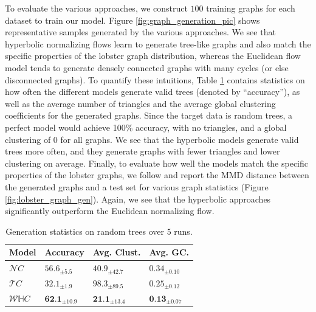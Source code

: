 To evaluate the various approaches, we construct $100$ training graphs for each dataset to train our model.
Figure \ref{fig:graph_generation_pic} shows representative samples generated by the various approaches.
We see that hyperbolic normalizing flows learn to generate tree-like graphs and also match the specific properties of the lobster graph distribution, whereas the Euclidean flow model tends to generate densely connected graphs with many cycles (or else disconnected graphs). 
To quantify these intuitions, Table \ref{tab:randtrees} contains statistics on how often the different models generate valid trees (denoted by ``accuracy''), as well as the average number of triangles and the average global clustering coefficients for the generated graphs. 
Since the target data is random trees, a perfect model would achieve 100\% accuracy, with no triangles, and a global clustering of 0 for all graphs. 
We see that the hyperbolic models generate valid trees more often, and they generate graphs with fewer triangles and lower clustering on average.
Finally, to evaluate how well the models match the specific properties of the lobster graphs, we follow \citet{liao2019efficient} and report the MMD distance between the generated graphs and a test set for various graph statistics (Figure \ref{fig:lobster_graph_gen}).
Again, we see that the hyperbolic approaches significantly outperform the Euclidean normalizing flow. 

\begin{table}[]
\label{graph_gen_table}
\begin{center}
\begin{tabular}{llll}
    \toprule
    Model   & Accuracy & Avg. Clust. & Avg. GC.\\
    \midrule
    $\mathcal{N}C$ & $56.6_{\pm 5.5}$ & $40.9_{\pm 42.7}$ & $0.34_{\pm0.10}$\\
    $\mathcal{T}C$ & $32.1_{\pm 1.9}$ & $98.3_{\pm 89.5}$ & $0.25_{\pm 0.12}$\\
    $\mathcal{W}\mathbb{H}C$ & $\textbf{62.1}_{\pm 10.9}$ & $\textbf{21.1}_{\pm 13.4}$ & $\textbf{0.13}_{\pm0.07}$\\
    \bottomrule
\end{tabular}
\end{center}
\caption{Generation statistics on random trees over $5$ runs.}
\label{tab:randtrees}
\vspace{-15pt}
\end{table}

